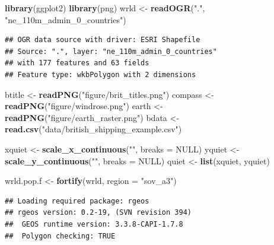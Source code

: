 \documentclass[]{article}
\newenvironment{Shaded}{}{}
\newcommand{\KeywordTok}[1]{\textcolor[rgb]{0.00,0.44,0.13}{\textbf{{#1}}}}
\newcommand{\DataTypeTok}[1]{\textcolor[rgb]{0.56,0.13,0.00}{{#1}}}
\newcommand{\StringTok}[1]{\textcolor[rgb]{0.25,0.44,0.63}{{#1}}}
\newcommand{\OtherTok}[1]{\textcolor[rgb]{0.00,0.44,0.13}{{#1}}}
\newcommand{\NormalTok}[1]{{#1}}
\begin{document}
\begin{Shaded}
\begin{Highlighting}[]
\KeywordTok{library}\NormalTok{(ggplot2)}
\KeywordTok{library}\NormalTok{(png)}
\NormalTok{wrld <- }\KeywordTok{readOGR}\NormalTok{(}\StringTok{"."}\NormalTok{, }\StringTok{"ne_110m_admin_0_countries"}\NormalTok{)}
\end{Highlighting}
\end{Shaded}
\begin{verbatim}
## OGR data source with driver: ESRI Shapefile 
## Source: ".", layer: "ne_110m_admin_0_countries"
## with 177 features and 63 fields
## Feature type: wkbPolygon with 2 dimensions
\end{verbatim}
\begin{Shaded}
\begin{Highlighting}[]
\NormalTok{btitle <- }\KeywordTok{readPNG}\NormalTok{(}\StringTok{"figure/brit_titles.png"}\NormalTok{)}
\NormalTok{compass <- }\KeywordTok{readPNG}\NormalTok{(}\StringTok{"figure/windrose.png"}\NormalTok{)}
\NormalTok{earth <- }\KeywordTok{readPNG}\NormalTok{(}\StringTok{"figure/earth_raster.png"}\NormalTok{)}
\NormalTok{bdata <- }\KeywordTok{read.csv}\NormalTok{(}\StringTok{"data/british_shipping_example.csv"}\NormalTok{)}
\end{Highlighting}
\end{Shaded}
\begin{Shaded}
\begin{Highlighting}[]
\NormalTok{xquiet <- }\KeywordTok{scale_x_continuous}\NormalTok{(}\StringTok{""}\NormalTok{, }\DataTypeTok{breaks =} \OtherTok{NULL}\NormalTok{)}
\NormalTok{yquiet <- }\KeywordTok{scale_y_continuous}\NormalTok{(}\StringTok{""}\NormalTok{, }\DataTypeTok{breaks =} \OtherTok{NULL}\NormalTok{)}
\NormalTok{quiet <- }\KeywordTok{list}\NormalTok{(xquiet, yquiet)}
\end{Highlighting}
\end{Shaded}
\begin{Shaded}
\begin{Highlighting}[]
\NormalTok{wrld.pop.f <- }\KeywordTok{fortify}\NormalTok{(wrld, }\DataTypeTok{region =} \StringTok{"sov_a3"}\NormalTok{)}
\end{Highlighting}
\end{Shaded}
\begin{verbatim}
## Loading required package: rgeos
## rgeos version: 0.2-19, (SVN revision 394)
##  GEOS runtime version: 3.3.8-CAPI-1.7.8 
##  Polygon checking: TRUE
\end{verbatim}
\end{document}
